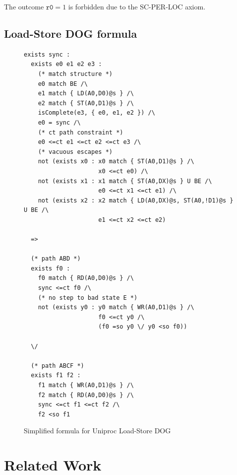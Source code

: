 \documentclass[10pt]{paper}
\newcommand{\axiom}[1]{\textsc{#1}}
\begin{document}
The outcome $\texttt{r0} = 1$ is forbidden due to the \axiom{SC-PER-LOC} axiom.

\subsection{Load-Store DOG formula}

\begin{figure}[p]
\begin{verbatim}
exists sync :
  exists e0 e1 e2 e3 :
    (* match structure *)
    e0 match BE /\
    e1 match { LD(A0,D0)@s } /\
    e2 match { ST(A0,D1)@s } /\
    isComplete(e3, { e0, e1, e2 }) /\
    e0 = sync /\
    (* ct path constraint *)
    e0 <=ct e1 <=ct e2 <=ct e3 /\
    (* vacuous escapes *)
    not (exists x0 : x0 match { ST(A0,D1)@s } /\
                     x0 <=ct e0) /\
    not (exists x1 : x1 match { ST(A0,DX)@s } U BE /\
                     e0 <=ct x1 <=ct e1) /\
    not (exists x2 : x2 match { LD(A0,DX)@s, ST(A0,!D1)@s } U BE /\
                     e1 <=ct x2 <=ct e2)

  =>

  (* path ABD *)
  exists f0 :
    f0 match { RD(A0,D0)@s } /\
    sync <=ct f0 /\
    (* no step to bad state E *)
    not (exists y0 : y0 match { WR(A0,D1)@s } /\
                     f0 <=ct y0 /\
                     (f0 =so y0 \/ y0 <so f0))

  \/

  (* path ABCF *)
  exists f1 f2 :
    f1 match { WR(A0,D1)@s } /\
    f2 match { RD(A0,D0)@s } /\
    sync <=ct f1 <=ct f2 /\
    f2 <so f1
\end{verbatim}
\caption{Simplified formula for Uniproc Load-Store DOG}
\label{fig:loadstore-formula}
\end{figure}


\section{Related Work}



\end{document}
